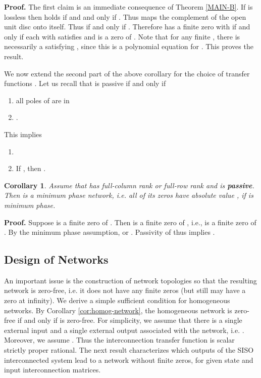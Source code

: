 \documentclass[twocolumn]{autart}    \usepackage{amsmath}
\newtheorem{corollary}{Corollary}
\begin{document}
\noindent \textbf{Proof.}
The first claim is an immediate consequence of Theorem
\ref{MAIN-B}. If  is lossless then   holds if and and
only if . Thus
  maps the complement
of the open unit disc onto itself.  Thus  if and only
if . Therefore  has a
finite  zero
 with  if and only if each  with  satisfies
 and is a zero
of . Note that for any finite , there is necessarily a   satisfying , since this is a polynomial equation for .  This proves the result.
\hfill 


We now extend the second part of the above corollary for  the choice of  transfer functions \cite{vaid93}.  Let us  recall that  is  passive  if and only if
\begin{enumerate}
\item
all poles of  are in 
\item
   .
\end{enumerate}
This implies
\begin{enumerate}
\item
   
\item
 If , then .
\end{enumerate}


\begin{corollary}
Assume that  has full-column rank or full-row rank and   is \textbf{passive}. Then   is a minimum phase network, i.e. all of its zeros have absolute value , if  is minimum phase.
\end{corollary}

\noindent \textbf{Proof.}
Suppose  is a finite zero of . Then  is a
finite zero of , i.e.,    is a finite zero of
. By the minimum phase assumption,  or
. Passivity of  thus implies .
\hfill 
\bigskip


\subsection{Design of Networks}
An important issue is the construction of network topologies so that
the resulting  network is zero-free, i.e. it does not have
any finite zeros (but still may have a zero at infinity). We derive a
simple sufficient condition for homogeneous networks. By Corollary
\ref{cor:homog-network}, the homogeneous network
 is zero-free if and only if 
is zero-free. For simplicity, we assume that there is a single
external input and a single external output associated with the
network, i.e. . Moreover, we assume . Thus the
interconnection transfer function  is
scalar strictly proper rational.
The next result characterizes which outputs of the SISO interconnected
system lead to a network without finite zeros, for given state and input
interconnection matrices.  
\end{document}
